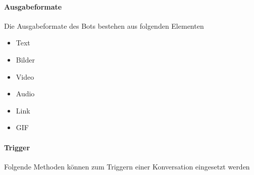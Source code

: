 \paragraph{Ausgabeformate} Die Ausgabeformate des Bots bestehen aus folgenden Elementen
\begin{itemize}
\item Text
\item Bilder
\item Video
\item Audio
\item Link
\item GIF
\end{itemize}

\paragraph{Trigger}Folgende Methoden können zum Triggern einer Konversation eingesetzt werden

